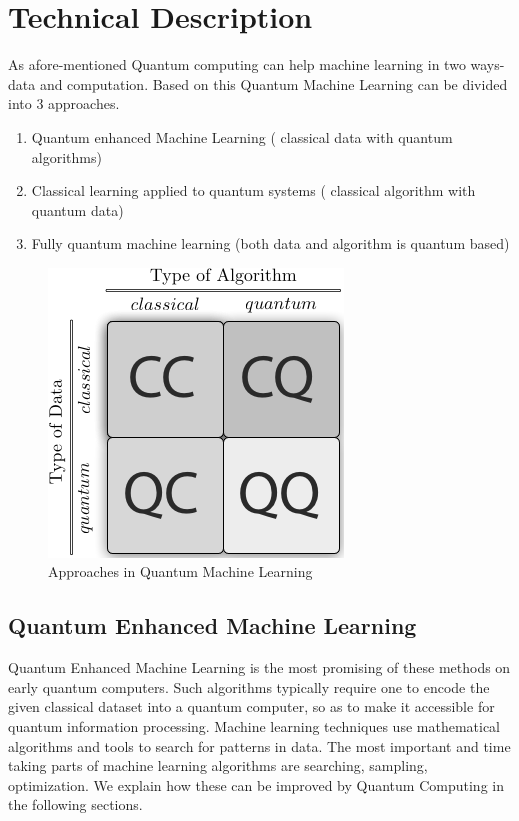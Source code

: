 \chapter{Technical Description}\label{ch:technical_description}
As afore-mentioned Quantum computing can help machine learning in two ways- data and computation. Based on this Quantum Machine Learning can be divided into 3 approaches.
\begin{enumerate}
\item Quantum enhanced Machine Learning ( classical data with quantum algorithms) 
\item Classical learning applied to quantum systems ( classical algorithm with quantum data)
\item Fully quantum machine learning (both data and algorithm is quantum based)
\end{enumerate}
\begin{figure}[H]
\centering\includegraphics[width=.3\textwidth]{images/approach.png}
\caption{Approaches in Quantum Machine Learning}
\end{figure}
\section{Quantum Enhanced Machine Learning}
Quantum Enhanced Machine Learning is the most promising of these methods on early quantum computers. Such algorithms typically require one to encode the given classical dataset into a quantum computer, so as to make it accessible for quantum information processing. Machine learning techniques use mathematical algorithms and tools to search for patterns in data. The most important and time taking parts of machine learning algorithms are searching, sampling, optimization. We explain how these can be improved by Quantum Computing in the following sections.
